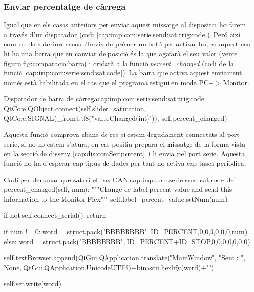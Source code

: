 \subsubsection{Enviar percentatge de càrrega}\label{cap:imp:com:serie:send:sat}

Igual que en els casos anteriors per enviar aquest missatge al dispositiu \Monitor ho farem a través d'un disparador (codi \ref{cap:imp:com:serie:send:sat:trig:code}). Peró així com en els anteriors casos s'havia de prémer un botó per activar-ho, en aquest cas hi ha una barra que en canviar de posició és la que agafarà el seu valor (veure figura {fig:comparacio:barra}) i cridarà a la funció \emph{percent\_changed} (codi de la funció \ref{cap:imp:com:serie:send:sat:code}).
La barra que activa aquest enviament només està habilitada en el cas que el programa \DCSMonitor estigui en mode PC$->$Monitor.

\begin{code_python}{Disparador de barra de càrrega}{cap:imp:com:serie:send:sat:trig:code}
QtCore.QObject.connect(self.slider_saturation, QtCore.SIGNAL(_fromUtf8("valueChanged(int)")), self.percent_changed)
\end{code_python}

Aquesta funció comprova abans de res si estem degudament connectats al port serie, si no ho estem s'atura, en cas positiu prepara el missatge de la forma vista en la secció de disseny \ref{cap:dis:comSer:percent}, i li envia pel port serie.
Aquesta funció no ha d'esperar cap tipus de dades per tant no activa cap tasca periòdica.

\begin{code_python}{Codi per demanar que saturi el bus CAN }{cap:imp:com:serie:send:sat:code}
def percent_changed(self, num):
    """Change de label percent value and send this information to the Monitor Flex"""
    self.label_percent_value.setNum(num)
    
    if not self.connect_serial():
            return
    
    if num != 0:
        word = struct.pack("BBBBBBBB", ID_PERCENT,0,0,0,0,0,0,num)
    else:
        word = struct.pack("BBBBBBBB", ID_PERCENT+ID_STOP,0,0,0,0,0,0,0)
    
    self.textBrowser.append(QtGui.QApplication.translate("MainWindow", "Sent : ", None, QtGui.QApplication.UnicodeUTF8)+binascii.hexlify(word)+"\n")
    
    self.ser.write(word)
\end{code_python}


